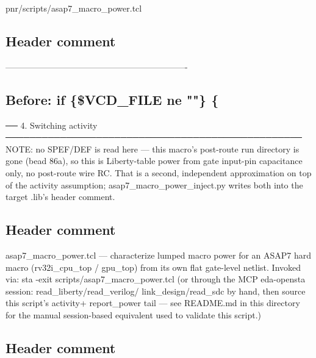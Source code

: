 \begin{relocated}{pnr/scripts/asap7_macro_power.tcl}
\begin{textblock}
\end{textblock}

\subsection*{Header comment}

\begin{textblock}
----------------------------------------------------------------
\end{textblock}

\subsection*{Before: if \{\$VCD\_FILE ne ""\} \{}

\begin{textblock}
── 4. Switching activity ─────────────────────────────────────────────────
NOTE: no SPEF/DEF is read here — this macro's post-route run directory is
gone (bead 86a), so this is Liberty-table power from gate input-pin
capacitance only, no post-route wire RC. That is a second, independent
approximation on top of the activity assumption; asap7_macro_power_inject.py
writes both into the target .lib's header comment.
\end{textblock}

\subsection*{Header comment}

\begin{textblock}
asap7_macro_power.tcl — characterize lumped macro power for an ASAP7 hard
macro (rv32i_cpu_top / gpu_top) from its own flat gate-level netlist.
Invoked via: sta -exit scripts/asap7_macro_power.tcl
  (or through the MCP eda-opensta session: read_liberty/read_verilog/
   link_design/read_sdc by hand, then source this script's activity+
   report_power tail — see README.md in this directory for the manual
   session-based equivalent used to validate this script.)
\end{textblock}

\subsection*{Header comment}


\end{relocated}
